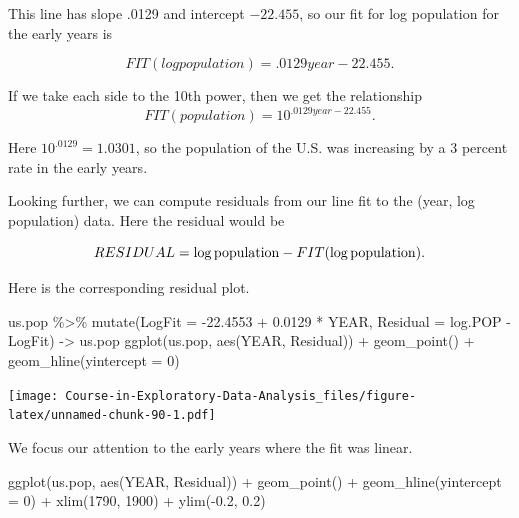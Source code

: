 \documentclass[
]{book}
\newenvironment{Shaded}{\begin{snugshade}}{\end{snugshade}}
\newcommand{\AttributeTok}[1]{\textcolor[rgb]{0.77,0.63,0.00}{#1}}
\newcommand{\DecValTok}[1]{\textcolor[rgb]{0.00,0.00,0.81}{#1}}
\newcommand{\FloatTok}[1]{\textcolor[rgb]{0.00,0.00,0.81}{#1}}
\newcommand{\FunctionTok}[1]{\textcolor[rgb]{0.00,0.00,0.00}{#1}}
\newcommand{\NormalTok}[1]{#1}
\newcommand{\OtherTok}[1]{\textcolor[rgb]{0.56,0.35,0.01}{#1}}
\newcommand{\SpecialCharTok}[1]{\textcolor[rgb]{0.00,0.00,0.00}{#1}}
\begin{document}
This line has slope .0129 and intercept \(-22.455\), so our fit for log population for the early years is

\[
FIT (log population) = .0129 year - 22.455.
\]

If we take each side to the 10th power, then we get the relationship
\[
FIT (population) = 10^{.0129 year - 22.455}.
\]

Here \(10^{.0129} = 1.0301\), so the population of the U.S. was increasing by a 3 percent rate in the early years.

Looking further, we can compute residuals from our line fit to the (year, log population) data. Here the residual would be

\[
RESIDUAL = {\rm log \, population} - FIT ({\rm log \, population}).
\]

Here is the corresponding residual plot.

\begin{Shaded}
\begin{Highlighting}[]
\NormalTok{us.pop }\SpecialCharTok{\%\textgreater{}\%} 
  \FunctionTok{mutate}\NormalTok{(}\AttributeTok{LogFit =} \SpecialCharTok{{-}}\FloatTok{22.4553} \SpecialCharTok{+} \FloatTok{0.0129} \SpecialCharTok{*}\NormalTok{ YEAR,}
         \AttributeTok{Residual =}\NormalTok{ log.POP }\SpecialCharTok{{-}}\NormalTok{ LogFit) }\OtherTok{{-}\textgreater{}}\NormalTok{ us.pop}
\FunctionTok{ggplot}\NormalTok{(us.pop, }\FunctionTok{aes}\NormalTok{(YEAR, Residual)) }\SpecialCharTok{+}
  \FunctionTok{geom\_point}\NormalTok{() }\SpecialCharTok{+}
  \FunctionTok{geom\_hline}\NormalTok{(}\AttributeTok{yintercept =} \DecValTok{0}\NormalTok{)}
\end{Highlighting}
\end{Shaded}

\texttt{[image: Course-in-Exploratory-Data-Analysis\_files/figure-latex/unnamed-chunk-90-1.pdf]}

We focus our attention to the early years where the fit was linear.

\begin{Shaded}
\begin{Highlighting}[]
\FunctionTok{ggplot}\NormalTok{(us.pop, }\FunctionTok{aes}\NormalTok{(YEAR, Residual)) }\SpecialCharTok{+}
  \FunctionTok{geom\_point}\NormalTok{() }\SpecialCharTok{+}
  \FunctionTok{geom\_hline}\NormalTok{(}\AttributeTok{yintercept =} \DecValTok{0}\NormalTok{) }\SpecialCharTok{+}
  \FunctionTok{xlim}\NormalTok{(}\DecValTok{1790}\NormalTok{, }\DecValTok{1900}\NormalTok{) }\SpecialCharTok{+}
  \FunctionTok{ylim}\NormalTok{(}\SpecialCharTok{{-}}\FloatTok{0.2}\NormalTok{, }\FloatTok{0.2}\NormalTok{)}
\end{Highlighting}
\end{Shaded}
\end{document}
